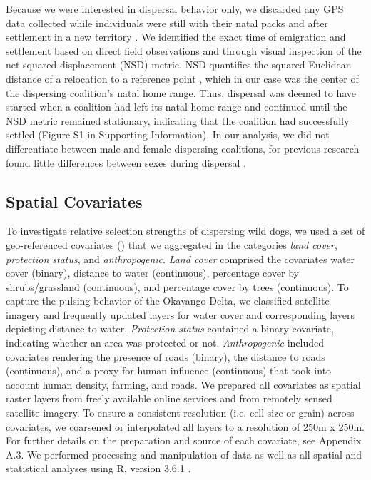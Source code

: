 \documentclass[abstract=on,10pt,a4paper,bibliography=totocnumbered]{article}
\begin{document}
Because we were interested in dispersal behavior only, we discarded any GPS data
collected while individuals were still with their natal packs and after
settlement in a new territory \citep{Cozzi.2020}. We identified the exact time
of emigration and settlement based on direct field observations and through
visual inspection of the net squared displacement (NSD) metric. NSD quantifies
the squared Euclidean distance of a relocation to a reference point
\citep{Borger.2012}, which in our case was the center of the dispersing
coalition's natal home range. Thus, dispersal was deemed to have started when a
coalition had left its natal home range and continued until the NSD metric
remained stationary, indicating that the coalition had successfully settled
(Figure S1 in Supporting Information). In our analysis, we did not differentiate
between male and female dispersing coalitions, for previous research found
little differences between sexes during dispersal \citep{Woodroffe.2019,
Cozzi.2020}.

\subsection{Spatial Covariates}
To investigate relative selection strengths of dispersing wild dogs, we used a
set of geo-referenced covariates () that we aggregated in the
categories \textit{land cover}, \textit{protection status}, and
\textit{anthropogenic}. \textit{Land cover} comprised the covariates water cover
(binary), distance to water (continuous), percentage cover by shrubs/grassland
(continuous), and percentage cover by trees (continuous). To capture the pulsing
behavior of the Okavango Delta, we classified satellite imagery and frequently
updated layers for water cover and corresponding layers depicting distance to
water. \textit{Protection status} contained a binary covariate, indicating
whether an area was protected or not. \textit{Anthropogenic} included covariates
rendering the presence of roads (binary), the distance to roads (continuous),
and a proxy for human influence (continuous) that took into account human
density, farming, and roads. We prepared all covariates as spatial raster layers
from freely available online services and from remotely sensed satellite
imagery. To ensure a consistent resolution (i.e. cell-size or grain) across
covariates, we coarsened or interpolated all layers to a resolution of 250m x
250m. For further details on the preparation and source of each covariate, see
Appendix A.3. We performed processing and manipulation of data as well as all
spatial and statistical analyses using R, version 3.6.1 \citep{R.2019}.
\end{document}
